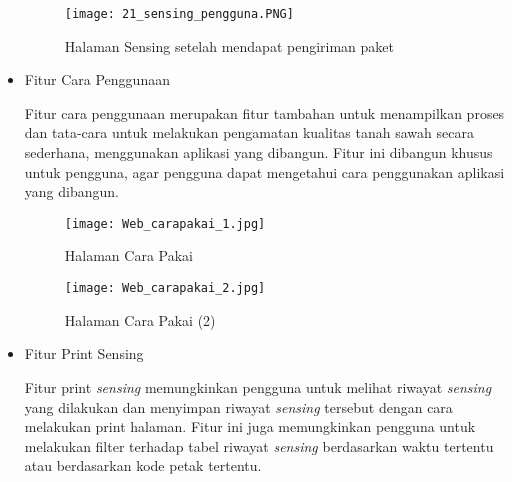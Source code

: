 \begin{itemize}
        \begin{figure}[H]
        	\centering  
        	\texttt{[image: 21\_sensing\_pengguna.PNG]}  
        	\caption[Halaman Sensing setelah mendapat pengiriman paket]{Halaman Sensing setelah mendapat pengiriman paket} 
        	\label{fig:Halaman Sensing setelah mendapat pengiriman paket} 
        \end{figure}
        
        
        \item Fitur Cara Penggunaan
        
        Fitur cara penggunaan merupakan fitur tambahan untuk menampilkan proses dan tata-cara untuk melakukan pengamatan kualitas tanah sawah secara sederhana, menggunakan aplikasi yang dibangun. Fitur ini dibangun khusus untuk pengguna, agar pengguna dapat mengetahui cara penggunakan aplikasi yang dibangun.
        
        \begin{figure}[H]
        	\centering  
        	\texttt{[image: Web\_carapakai\_1.jpg]}  
        	\caption[Halaman Cara Pakai]{Halaman Cara Pakai} 
        	\label{fig:Halaman Cara Pakai} 
        \end{figure}
        
        \begin{figure}[H]
        	\centering  
        	\texttt{[image: Web\_carapakai\_2.jpg]}  
        	\caption[Halaman Cara Pakai 2]{Halaman Cara Pakai (2)} 
        	\label{fig:Halaman Cara Pakai 2} 
        \end{figure}
        
        
        
        
        \item Fitur Print Sensing
        
        Fitur print \textit{sensing} memungkinkan pengguna untuk melihat riwayat \textit{sensing} yang dilakukan dan menyimpan riwayat \textit{sensing} tersebut dengan cara melakukan print halaman. Fitur ini juga memungkinkan pengguna untuk melakukan filter terhadap tabel riwayat \textit{sensing} berdasarkan waktu tertentu atau berdasarkan kode petak tertentu.
        

\end{itemize}

